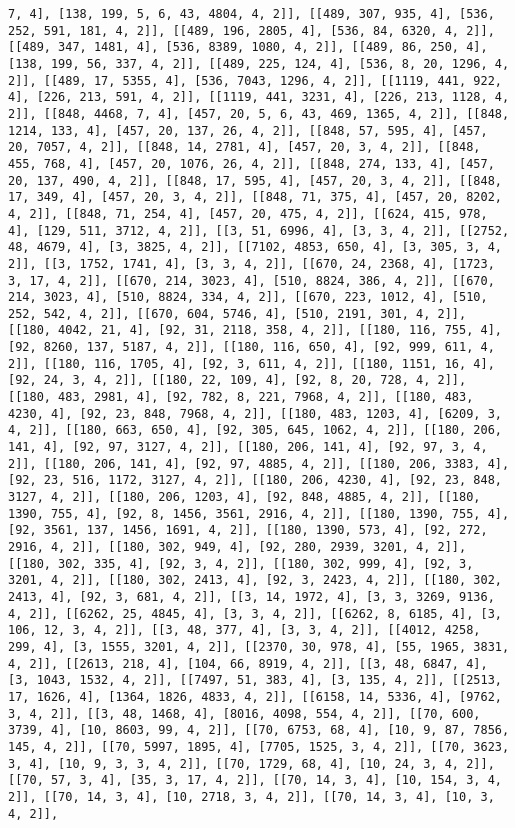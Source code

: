 \documentclass[12pt,fleqn]{article}\usepackage{../../common}
\begin{document}
\begin{verbatim}
7, 4], [138, 199, 5, 6, 43, 4804, 4, 2]], [[489, 307, 935, 4], [536, 252, 591, 181, 4, 2]], [[489, 196, 2805, 4], [536, 84, 6320, 4, 2]], [[489, 347, 1481, 4], [536, 8389, 1080, 4, 2]], [[489, 86, 250, 4], [138, 199, 56, 337, 4, 2]], [[489, 225, 124, 4], [536, 8, 20, 1296, 4, 2]], [[489, 17, 5355, 4], [536, 7043, 1296, 4, 2]], [[1119, 441, 922, 4], [226, 213, 591, 4, 2]], [[1119, 441, 3231, 4], [226, 213, 1128, 4, 2]], [[848, 4468, 7, 4], [457, 20, 5, 6, 43, 469, 1365, 4, 2]], [[848, 1214, 133, 4], [457, 20, 137, 26, 4, 2]], [[848, 57, 595, 4], [457, 20, 7057, 4, 2]], [[848, 14, 2781, 4], [457, 20, 3, 4, 2]], [[848, 455, 768, 4], [457, 20, 1076, 26, 4, 2]], [[848, 274, 133, 4], [457, 20, 137, 490, 4, 2]], [[848, 17, 595, 4], [457, 20, 3, 4, 2]], [[848, 17, 349, 4], [457, 20, 3, 4, 2]], [[848, 71, 375, 4], [457, 20, 8202, 4, 2]], [[848, 71, 254, 4], [457, 20, 475, 4, 2]], [[624, 415, 978, 4], [129, 511, 3712, 4, 2]], [[3, 51, 6996, 4], [3, 3, 4, 2]], [[2752, 48, 4679, 4], [3, 3825, 4, 2]], [[7102, 4853, 650, 4], [3, 305, 3, 4, 2]], [[3, 1752, 1741, 4], [3, 3, 4, 2]], [[670, 24, 2368, 4], [1723, 3, 17, 4, 2]], [[670, 214, 3023, 4], [510, 8824, 386, 4, 2]], [[670, 214, 3023, 4], [510, 8824, 334, 4, 2]], [[670, 223, 1012, 4], [510, 252, 542, 4, 2]], [[670, 604, 5746, 4], [510, 2191, 301, 4, 2]], [[180, 4042, 21, 4], [92, 31, 2118, 358, 4, 2]], [[180, 116, 755, 4], [92, 8260, 137, 5187, 4, 2]], [[180, 116, 650, 4], [92, 999, 611, 4, 2]], [[180, 116, 1705, 4], [92, 3, 611, 4, 2]], [[180, 1151, 16, 4], [92, 24, 3, 4, 2]], [[180, 22, 109, 4], [92, 8, 20, 728, 4, 2]], [[180, 483, 2981, 4], [92, 782, 8, 221, 7968, 4, 2]], [[180, 483, 4230, 4], [92, 23, 848, 7968, 4, 2]], [[180, 483, 1203, 4], [6209, 3, 4, 2]], [[180, 663, 650, 4], [92, 305, 645, 1062, 4, 2]], [[180, 206, 141, 4], [92, 97, 3127, 4, 2]], [[180, 206, 141, 4], [92, 97, 3, 4, 2]], [[180, 206, 141, 4], [92, 97, 4885, 4, 2]], [[180, 206, 3383, 4], [92, 23, 516, 1172, 3127, 4, 2]], [[180, 206, 4230, 4], [92, 23, 848, 3127, 4, 2]], [[180, 206, 1203, 4], [92, 848, 4885, 4, 2]], [[180, 1390, 755, 4], [92, 8, 1456, 3561, 2916, 4, 2]], [[180, 1390, 755, 4], [92, 3561, 137, 1456, 1691, 4, 2]], [[180, 1390, 573, 4], [92, 272, 2916, 4, 2]], [[180, 302, 949, 4], [92, 280, 2939, 3201, 4, 2]], [[180, 302, 335, 4], [92, 3, 4, 2]], [[180, 302, 999, 4], [92, 3, 3201, 4, 2]], [[180, 302, 2413, 4], [92, 3, 2423, 4, 2]], [[180, 302, 2413, 4], [92, 3, 681, 4, 2]], [[3, 14, 1972, 4], [3, 3, 3269, 9136, 4, 2]], [[6262, 25, 4845, 4], [3, 3, 4, 2]], [[6262, 8, 6185, 4], [3, 106, 12, 3, 4, 2]], [[3, 48, 377, 4], [3, 3, 4, 2]], [[4012, 4258, 299, 4], [3, 1555, 3201, 4, 2]], [[2370, 30, 978, 4], [55, 1965, 3831, 4, 2]], [[2613, 218, 4], [104, 66, 8919, 4, 2]], [[3, 48, 6847, 4], [3, 1043, 1532, 4, 2]], [[7497, 51, 383, 4], [3, 135, 4, 2]], [[2513, 17, 1626, 4], [1364, 1826, 4833, 4, 2]], [[6158, 14, 5336, 4], [9762, 3, 4, 2]], [[3, 48, 1468, 4], [8016, 4098, 554, 4, 2]], [[70, 600, 3739, 4], [10, 8603, 99, 4, 2]], [[70, 6753, 68, 4], [10, 9, 87, 7856, 145, 4, 2]], [[70, 5997, 1895, 4], [7705, 1525, 3, 4, 2]], [[70, 3623, 3, 4], [10, 9, 3, 3, 4, 2]], [[70, 1729, 68, 4], [10, 24, 3, 4, 2]], [[70, 57, 3, 4], [35, 3, 17, 4, 2]], [[70, 14, 3, 4], [10, 154, 3, 4, 2]], [[70, 14, 3, 4], [10, 2718, 3, 4, 2]], [[70, 14, 3, 4], [10, 3, 4, 2]], 
\end{verbatim}
\end{document}
